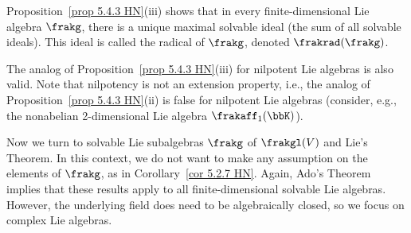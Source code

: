 \begin{defn}[Radical]
    Proposition~\ref{prop 5.4.3 HN}(iii) shows that in every finite-dimensional Lie algebra $\frakg$, there is a unique maximal solvable ideal (the sum of all solvable ideals). This ideal is called the radical of $\frakg$, denoted $\frakrad(\frakg)$.
\end{defn}

\begin{rem}
    The analog of Proposition~\ref{prop 5.4.3 HN}(iii) for nilpotent Lie algebras is also valid. Note that nilpotency is not an extension property, i.e., the analog of Proposition~\ref{prop 5.4.3 HN}(ii) is false for nilpotent Lie algebras (consider, e.g., the nonabelian 2-dimensional Lie algebra $\frakaff_1(\bbK)$). 
\end{rem}

Now we turn to solvable Lie subalgebras $\frakg$ of $\frakgl(V)$ and Lie's Theorem. In this context, we do not want to make any assumption on the elements of $\frakg$, as in Corollary~\ref{cor 5.2.7 HN}. Again, Ado's Theorem implies that these results apply to all finite-dimensional solvable Lie algebras. However, the underlying field does need to be algebraically closed, so we focus on complex Lie algebras.

